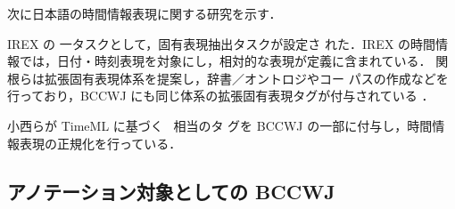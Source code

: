 \documentclass[japanese]{jnlp_1.4}
\newcommand{\modified}[1]{}
\def\timexiii{}
\begin{document}
\modified{海外においては，哲学者・言語学者・人工知能
研究者・言語処理研究者が共有可能な言語資源を作成するという大義のもと，分野横
断的に研究が進められている．さらに多言語に拡張すべく言語横断的に研究が進められて
いる．このような状況のもと個々の研究について境界を明確に示すことは難しい．}

次に日本語の時間情報表現に関する研究を示す．
\modified{日本語において，時間情報表現抽出はアノテーションのみならず，評価型会議による解析
手法の検討が行われている．}
IREX \cite{IREX}の 一タスクとして，固有表現抽出タスクが設定さ
れた．IREX の時間情報では，日付・時刻表現を対象にし，相対的な表現が定義に含まれている．
関根らは拡張固有表現体系\cite{Sekine-2002}を提案し，辞書／オントロジやコー
パスの作成などを行っており，BCCWJ にも同じ体系の拡張固有表現タグが付与されている
\cite{Hashimoto-2010}．
\modified{時間情報表現正規化については，}
小西らが  TimeML に基づく \timexiii\ 相当のタ
グを BCCWJ の一部に付与し，時間情報表現の正規化を行っている\cite{小西-2013}． 
\modified{しかしながら，日本語の時間情報表現と事象表現をひもづける時間的順序関係に関する研究は，著者らが知る限りない．}

\modified{最後に，時間的順序関係アノテーションの目的について言及する．
工学研究者は(1)時間情報を解析する構造学習器の構成やベンチマークデータの
整備を目的としている．
一方，言語研究者は，(2)事象表現の時間構造を表現する形式意味論としての記述
体系の精緻化を目的としている．
これらに対し，本研究は(3)受容者としてのアノテーション作業者という要素を考慮し，
認知意味論的な分析を目的とする．(3) の目的のために，被験者実験的な設定のアノテーションを実施する．}


\subsection{アノテーション対象としての BCCWJ}
\label{subsec:bccwj}

\modified{本節ではアノテーション対象である BCCWJ について述べる．}

\modified{約1億語規模の書き言葉均衡コーパスである BCCWJ は2006--2010年に整備され，
2011年に国立国語研究所（以下「国語研」と略す）から一般公開された．
サンプリングの手法から生産サブコーパス・図書館サブコーパス・特定目的サブコーパス
の三つに大きく分かれる．生産サブコーパスは 2001--2005年に出版された書籍(PB)・雑誌
(PM)・新聞(PN)により構成され，生産実態に基づいてランダムサンプリングされている．
図書館サブコーパスは1986--2005年に出版された書籍(LB)により構成され，流通実態に基
づいてランダムサンプリングされている．特定目的サブコーパスは図書館サブコーパスで
十分に集まりにくい，白書(OW)・Yahoo!知恵袋(OC)・Yahoo!ブログ(OY)・国会会議録(OM) など様々なレジスタのテキストが収録されている．}
\end{document}
